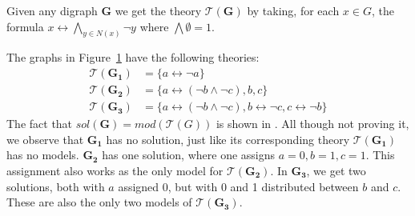 Given any digraph \textbf{G} we get the theory $\mathcal{T}(\mathbf{G})$ by taking, for each $x \in G$, the formula $x \leftrightarrow \bigwedge_{y \in N(x)} \neg y$ where $\bigwedge \emptyset = 1$.\par
\begin{figure}[!h]
  \centering
  \caption{}
  \label{ex:3graphs}
\end{figure}
  The graphs in Figure~\ref{ex:3graphs} have the following theories:
\begin{align}
  \mathcal{T}(\mathbf{G_1}) &= \big \{ a \leftrightarrow \neg a \big \} \\
  \mathcal{T}(\mathbf{G_2}) &= \big \{ a \leftrightarrow (\neg b \wedge \neg c), b, c \big \}\\
  \mathcal{T}(\mathbf{G_3}) &= \big \{ a \leftrightarrow (\neg b \wedge \neg c), b \leftrightarrow \neg c, c \leftrightarrow \neg b \big \}
\end{align}
The fact that $sol(\mathbf{G}) = mod(\mathcal{T}(G))$ is shown in \cite{apal-digraph}.
All though not proving it, we observe that $\mathbf{G_1}$ has no solution, just like its corresponding theory $\mathcal{T}(\mathbf{G_1})$ has no models.
$\mathbf{G_2}$ has one solution, where one assigns $a=0, b=1, c=1$.
This assignment also works as the only model for $\mathcal{T}(\mathbf{G_2})$.
In $\mathbf{G_3}$, we get two solutions, both with $a$ assigned 0, but with 0 and 1 distributed between $b$ and $c$.
These are also the only two models of $\mathcal{T}(\mathbf{G_3})$.

